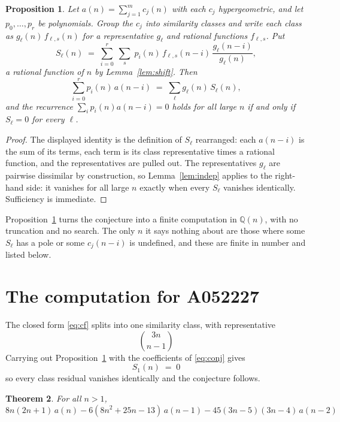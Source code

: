 \documentclass[11pt,a4paper]{article}
\theoremstyle{plain}
\newtheorem{theorem}{Theorem}
\newtheorem{proposition}[theorem]{Proposition}
\theoremstyle{definition}
\begin{document}
\begin{proposition}\label{prop:main}
Let $a(n)=\sum_{j=1}^{m}c_{j}(n)$ with each $c_{j}$ hypergeometric, and let
$p_{0},\dots,p_{r}$ be polynomials. Group the $c_{j}$ into similarity classes and write
each class as $g_{\ell}(n)\,f_{\ell,s}(n)$ for a representative $g_{\ell}$ and rational
functions $f_{\ell,s}$. Put
\[
S_{\ell}(n)\;=\;\sum_{i=0}^{r}\;\sum_{s}\;p_{i}(n)\,f_{\ell,s}(n-i)\,
\frac{g_{\ell}(n-i)}{g_{\ell}(n)} ,
\]
a rational function of $n$ by Lemma~\ref{lem:shift}. Then
\[
\sum_{i=0}^{r}p_{i}(n)\,a(n-i)\;=\;\sum_{\ell}g_{\ell}(n)\,S_{\ell}(n),
\]
and the recurrence $\sum_{i}p_{i}(n)a(n-i)=0$ holds for all large $n$ if and only if
$S_{\ell}=0$ for every $\ell$.
\end{proposition}

\begin{proof}
The displayed identity is the definition of $S_{\ell}$ rearranged: each $a(n-i)$ is the
sum of its terms, each term is its class representative times a rational function, and the
representatives are pulled out. The representatives $g_{\ell}$ are pairwise dissimilar by
construction, so Lemma~\ref{lem:indep} applies to the right-hand side: it vanishes for all
large $n$ exactly when every $S_{\ell}$ vanishes identically. Sufficiency is immediate.
\end{proof}

Proposition~\ref{prop:main} turns the conjecture into a finite computation in
$\mathbb{Q}(n)$, with no truncation and no search. The only $n$ it says nothing about are
those where some $S_{\ell}$ has a pole or some $c_{j}(n-i)$ is undefined, and these are
finite in number and listed below.

\section{The computation for A052227}

The closed form \eqref{eq:cf} splits into one similarity class, with
representative
\[
{\binom{3 n}{n - 1}}
\]
Carrying out Proposition~\ref{prop:main} with the coefficients of \eqref{eq:conj} gives
\[
S_{1}(n)\;=\;0
\]
so every class residual vanishes identically and the conjecture follows.

\begin{theorem}
For all $n> 1$,
\[
8 n \left(2 n + 1\right)\,a(n) -  6 \left(8 n^{2} + 25 n - 13\right)\,a(n-1) -  45 \left(3 n - 5\right) \left(3 n - 4\right)\,a(n-2)
\]
\end{theorem}
\end{document}
